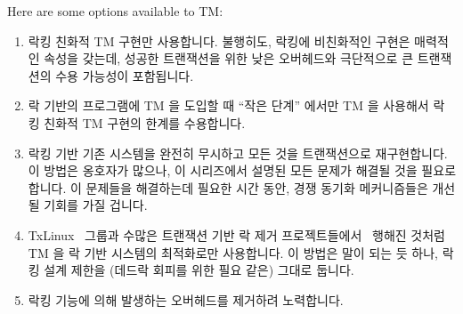 Here are some options available to TM:

\fi

\begin{enumerate}
\item	락킹 친화적 TM 구현만 사용합니다.
	불행히도, 락킹에 비친화적인 구현은 매력적인 속성을 갖는데, 성공한
	트랜잭션을 위한 낮은 오버헤드와 극단적으로 큰 트랜잭션의 수용 가능성이
	포함됩니다.
\item	락 기반의 프로그램에 TM 을 도입할 때 ``작은 단계'' 에서만 TM 을
	사용해서 락킹 친화적 TM 구현의 한계를 수용합니다.
\item	락킹 기반 기존 시스템을 완전히 무시하고 모든 것을 트랜잭션으로
	재구현합니다.
	이 방법은 옹호자가 많으나, 이 시리즈에서 설명된 모든 문제가 해결될 것을
	필요로 합니다.
	이 문제들을 해결하는데 필요한 시간 동안, 경쟁 동기화 메커니즘들은
	개선될 기회를 가질 겁니다.
\item	TxLinux~\cite{ChistopherJRossbach2007a} 그룹과 수많은 트랜잭션 기반 락
	제거
	프로젝트들에서~\cite{MartinPohlack2011HTM2TLE,Kleen:2014:SEL:2566590.2576793,PascalFelber2016rwlockElision,SeongJaePark2020HTMRCUlock}
	행해진 것처럼TM 을 락 기반 시스템의 최적화로만 사용합니다.
	이 방법은 말이 되는 듯 하나, 락킹 설계 제한을 (데드락 회피를 위한 필요
	같은) 그대로 둡니다.
\item	락킹 기능에 의해 발생하는 오버헤드를 제거하려 노력합니다.

\end{enumerate}

